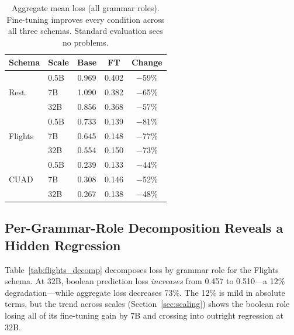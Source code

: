 \documentclass{article}
\begin{document}
\begin{table}[t]
\centering
\small
\begin{tabular}{llccc}
\toprule
\textbf{Schema} & \textbf{Scale} & \textbf{Base} & \textbf{FT} & \textbf{Change} \\
\midrule
\multirow{3}{*}{Rest.} & 0.5B & 0.969 & 0.402 & $-$59\% \\
                        & 7B   & 1.090 & 0.382 & $-$65\% \\
                        & 32B  & 0.856 & 0.368 & $-$57\% \\
\midrule
\multirow{3}{*}{Flights} & 0.5B & 0.733 & 0.139 & $-$81\% \\
                          & 7B   & 0.645 & 0.148 & $-$77\% \\
                          & 32B  & 0.554 & 0.150 & $-$73\% \\
\midrule
\multirow{3}{*}{CUAD} & 0.5B & 0.239 & 0.133 & $-$44\% \\
                       & 7B   & 0.308 & 0.146 & $-$52\% \\
                       & 32B  & 0.267 & 0.138 & $-$48\% \\
\bottomrule
\end{tabular}
\caption{Aggregate mean loss (all grammar roles). Fine-tuning improves every condition across all three schemas. Standard evaluation sees no problems.}
\label{tab:aggregate}
\end{table}

\subsection{Per-Grammar-Role Decomposition Reveals a Hidden Regression}

Table~\ref{tab:flights_decomp} decomposes loss by grammar role for the Flights schema. At 32B, boolean prediction loss \emph{increases} from 0.457 to 0.510---a 12\% degradation---while aggregate loss decreases 73\%. The 12\% is mild in absolute terms, but the trend across scales (Section~\ref{sec:scaling}) shows the boolean role losing all of its fine-tuning gain by 7B and crossing into outright regression at 32B.
\end{document}
